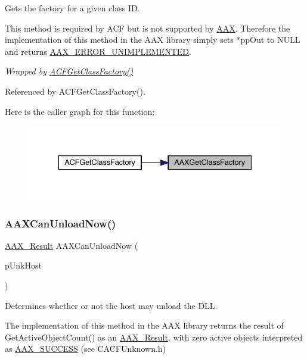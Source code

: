 Gets the factory for a given class ID. 

This method is required by A\+CF but is not supported by \mbox{\hyperlink{a00852}{A\+AX}}. Therefore the implementation of this method in the A\+AX library simply sets {\ttfamily $\ast$pp\+Out} to N\+U\+LL and returns \mbox{\hyperlink{a00494_a5f8c7439f3a706c4f8315a9609811937a3b76994b32b97fcd56b19ef8032245df}{A\+A\+X\+\_\+\+E\+R\+R\+O\+R\+\_\+\+U\+N\+I\+M\+P\+L\+E\+M\+E\+N\+T\+ED}}.

{\itshape Wrapped by \mbox{\hyperlink{a00500_a63cbe0222beee199dad20c26e79ebeaa}{A\+C\+F\+Get\+Class\+Factory()}} } 

Referenced by A\+C\+F\+Get\+Class\+Factory().

Here is the caller graph for this function\+:
\nopagebreak
\begin{figure}[H]
\begin{center}
\leavevmode
\includegraphics[width=337pt]{a00617_a84cf37211a57dbaec9e7d077dd171798_icgraph}
\end{center}
\end{figure}
\mbox{\label{a00617_a160de7bc2883da8ba24400933d814523}} 
\subsubsection{\texorpdfstring{AAXCanUnloadNow()}{AAXCanUnloadNow()}}
{\footnotesize\ttfamily \mbox{\hyperlink{a00392_a4d8f69a697df7f70c3a8e9b8ee130d2f}{A\+A\+X\+\_\+\+Result}} A\+A\+X\+Can\+Unload\+Now (\begin{DoxyParamCaption}\item[{\mbox{\hyperlink{a01409}{I\+A\+C\+F\+Unknown}} $\ast$}]{p\+Unk\+Host }\end{DoxyParamCaption})}



Determines whether or not the host may unload the D\+LL. 

The implementation of this method in the A\+AX library returns the result of {\ttfamily Get\+Active\+Object\+Count()} as an \mbox{\hyperlink{a00392_a4d8f69a697df7f70c3a8e9b8ee130d2f}{A\+A\+X\+\_\+\+Result}}, with zero active objects interpreted as \mbox{\hyperlink{a00494_a5f8c7439f3a706c4f8315a9609811937aeddbd1bb67e3a66e6af54a4b4a7a57b3}{A\+A\+X\+\_\+\+S\+U\+C\+C\+E\+SS}} (see C\+A\+C\+F\+Unknown.\+h)

